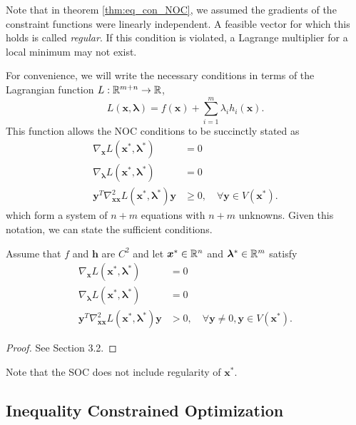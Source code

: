 Note that in theorem \ref{thm:eq_con_NOC}, we assumed the gradients of the constraint functions were linearly independent. A feasible vector for which this holds is called \textit{regular}. If this condition is violated, a Lagrange multiplier for a local minimum may not exist. 

For convenience, we will write the necessary conditions in terms of the Lagrangian function $L:\mathbb{R}^{m+n} \to \mathbb{R}$,
\begin{equation}
    L(\bm{x},\bm{\lambda}) = f(\bm{x}) + \sum^m_{i=1} \lambda_i h_i(\bm{x}).
\end{equation}
This function allows the NOC conditions to be succinctly stated as 
\begin{align}
    \nabla_{\bm{x}} L(\bm{x}^*,\bm{\lambda}^*) &= 0\\
    \nabla_{\bm{\lambda}} L(\bm{x}^*,\bm{\lambda}^*) &= 0\\
    \bm{y}^T \nabla^2_{\bm{xx}} L(\bm{x}^*,\bm{\lambda}^*) \bm{y} &\geq 0, \quad \forall \bm{y} \in V(\bm{x}^*).
\end{align}
which form a system of $n+m$ equations with $n+m$ unknowns. Given this notation, we can state the sufficient conditions. 

\begin{theorem}
Assume that $f$ and $\bm{h}$ are $C^2$ and let $\bm{x}^* \in \mathbb{R}^n$ and $\bm{\lambda}^* \in \mathbb{R}^m$ satisfy
\begin{align}
    \nabla_{\bm{x}} L(\bm{x}^*,\bm{\lambda}^*) &= 0\\
    \nabla_{\bm{\lambda}} L(\bm{x}^*,\bm{\lambda}^*) &= 0\\
    \bm{y}^T \nabla^2_{\bm{xx}} L(\bm{x}^*,\bm{\lambda}^*) \bm{y} &> 0, \quad \forall \bm{y} \neq 0, \bm{y} \in V(\bm{x}^*).
\end{align}
\end{theorem}

\begin{proof}
See \cite{bertsekas2016nonlinear} Section 3.2.
\end{proof}
Note that the SOC does not include regularity of $\bm{x}^*$. 

\subsection{Inequality Constrained Optimization}


